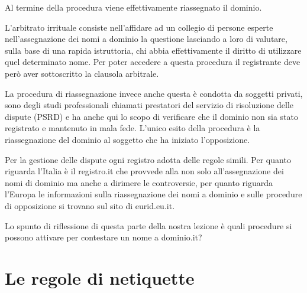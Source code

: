 Al termine della procedura viene effettivamente riassegnato il dominio. \par
L'arbitrato irrituale consiste nell'affidare ad un collegio di persone esperte nell'assegnazione dei nomi a dominio la questione lasciando a loro di valutare, sulla base di una rapida istruttoria, chi abbia effettivamente il diritto di utilizzare quel determinato nome. Per poter accedere a questa procedura il registrante deve però aver sottoscritto la clausola arbitrale. \par
La procedura di riassegnazione invece anche questa è condotta da soggetti privati, sono degli studi professionali chiamati prestatori del servizio di risoluzione delle dispute (PSRD) e ha anche qui lo scopo di verificare che il dominio non sia stato registrato e mantenuto in mala fede. L'unico esito della procedura è la riassegnazione del dominio al soggetto che ha iniziato l'opposizione.\par

Per la gestione delle dispute ogni registro adotta delle regole simili. Per quanto riguarda l'Italia è il registro.it che provvede alla non solo all'assegnazione dei nomi di dominio ma anche a dirimere le controversie, per quanto riguarda l'Europa le informazioni sulla riassegnazione dei nomi a dominio e sulle procedure di opposizione si trovano sul sito di eurid.eu.it.\par

Lo spunto di riflessione di questa parte della nostra lezione è quali procedure si possono attivare per contestare un nome a dominio.it?

\section{Le regole di netiquette}

